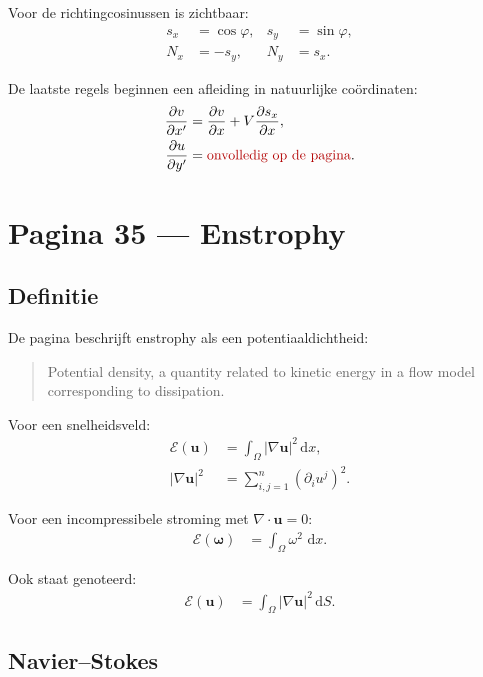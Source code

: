 \documentclass[11pt]{article}
\newcommand{\dd}{\,\mathrm{d}}
\newcommand{\pd}[2]{\frac{\partial #1}{\partial #2}}
\newcommand{\vect}[1]{\mathbf{#1}}
\newcommand{\onzeker}[1]{\textcolor{red!70!black}{#1}}
\begin{document}
Voor de richtingcosinussen is zichtbaar:
\begin{align*}
s_x &= \cos\varphi,
&
s_y &= \sin\varphi,
\\
N_x &= -s_y,
&
N_y &= s_x.
\end{align*}

De laatste regels beginnen een afleiding in natuurlijke coördinaten:
\begin{align*}
\pd{v}{x'}
&=
\pd{v}{x}
+
V\pd{s_x}{x},
\\
\pd{u}{y'}
&=
\onzeker{\text{onvolledig op de pagina}}.
\end{align*}

\newpage

\section*{Pagina 35 --- Enstrophy}

\subsection*{Definitie}

De pagina beschrijft enstrophy als een potentiaaldichtheid:
\begin{quote}
Potential density, a quantity related to kinetic energy in a flow model corresponding to dissipation.
\end{quote}

Voor een snelheidsveld:
\begin{align*}
\mathcal{E}\left(\vect{u}\right)
  &=
  \int_{\Omega}
  \left|\nabla\vect{u}\right|^2
  \dd x,
\\
\left|\nabla\vect{u}\right|^2
  &=
  \sum_{i,j=1}^{n}
  \left(\partial_i u^j\right)^2 .
\end{align*}

Voor een incompressibele stroming met $\nabla\cdot\vect{u}=0$:
\begin{align*}
\mathcal{E}\left(\bm{\omega}\right)
  &=
  \int_{\Omega}
  \omega^2\,\dd x.
\end{align*}

Ook staat genoteerd:
\begin{align*}
\mathcal{E}\left(\vect{u}\right)
  &=
  \int_{\Omega}
  \left|\nabla\vect{u}\right|^2
  \dd S.
\end{align*}

\subsection*{Navier--Stokes}
\end{document}
